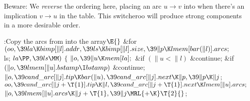 Beware: We {\it reverse\/} the ordering here, placing an
arc $u\to v$ into  when there's an implication $v\to u$
in the  table. This switcheroo will produce strong components
in a more desirable order.

\Y\B\4:Copy the arcs from  into the  array\X${}%
\E{}$\6
\&{for} ${}(\\{oo},\39\\{la}\K\\{bimp}[\|l].\\{addr},\39\\{ls}\K\\{bimp}[\|l].%
\\{size},\39\|p\K\\{lmem}[\\{bar}(\|l)].\\{arcs};{}$ \\{ls}; ${}\\{la}\PP,\39%
\\{ls}\MM){}$\5
${}\{{}$\1\6
${}\|o,\39\|u\K\\{mem}[\\{la}];{}$\6
\&{if} ${}(\|u<\|l){}$\1\5
\&{continue};\2\6
\&{if} ${}(\|o,\39\\{lmem}[\|u].\\{bstamp}\I\\{bstamp}){}$\1\5
\&{continue};\2\6
${}\|o,\39\\{cand\_arc}[\|j].\\{tip}\K\\{bar}(\|u),\39\\{cand\_arc}[\|j].%
\\{next}\K\|p,\39\|p\K\|j{}$;\6
${}\\{oo},\39\\{cand\_arc}[\|j+\T{1}].\\{tip}\K\|l,\39\\{cand\_arc}[\|j+\T{1}].%
\\{next}\K\\{lmem}[\|u].\\{arcs};{}$\6
${}\|o,\39\\{lmem}[\|u].\\{arcs}\K\|j+\T{1},\39\|j\MRL{+{\K}}\T{2}{}$;\6

